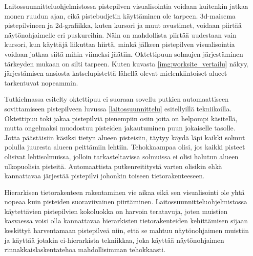 Laitossuunnitteluohjelmistossa pistepilven visualisointia voidaan kuitenkin jatkaa monen ruudun ajan, eikä pistebudjetin käyttäminen ole tarpeen. 3d-maisema pistepilvineen ja 2d-grafiikka, kuten kursori ja muut avustimet, voidaan piirtää näytönohjaimelle eri puskureihin. Näin on mahdollista piirtää uudestaan vain kursori, kun käyttäjä liikuttaa hiirtä, minkä jälkeen pistepilven visualisointia voidaan jatkaa siitä mihin viimeksi jäätiin. Oktettipuun solmujen järjestäminen tärkeyden mukaan on silti tarpeen. Kuten kuvasta \ref{img:worksite_vertailu} näkyy, järjestämisen ansiosta katselupistettä lähellä olevat mielenkiintoiset alueet tarkentuvat nopeammin.


Tutkielmassa esitelty oktettipuu ei suoraan sovellu putkien automaattiseen sovittamiseen pistepilveen luvussa \ref{laitossuunnittelu} esitellyillä tekniikoilla. Oktettipuu toki jakaa pistepilviä pienempiin osiin joita on helpompi käsitellä, mutta ongelmaksi muodostuu pisteiden jakautuminen puun jokaiselle tasolle. Jotta päästäisiin käsiksi tietyn alueen pisteisiin, täytyy käydä läpi kaikki solmut polulla juuresta alueen peittämiin lehtiin. Tehokkaampaa olisi, jos kaikki pisteet olisivat lehtisolmuissa, jolloin tarkasteltavissa solmuissa ei olisi halutun alueen ulkopuolisia pisteitä. Automaattista putkenreititystä varten olisikin ehkä kannattavaa järjestää pistepilvi johonkin toiseen tietorakenteeseen. 

Hierarkisen tietorakenteen rakentaminen vie aikaa eikä sen visualisointi ole yhtä nopeaa kuin pisteiden suoraviivainen piirtäminen. Laitossuunnitteluohjelmistossa käytettävien pistepilvien kokoluokka on harvoin teratavuja, joten muistien kasvaessa voisi olla kannattavaa hierarkisten tietorakenteiden kehittämisen sijaan keskittyä harventamaan pistepilveä niin, että se mahtuu näytönohjaimen muistiin ja käyttää jotakin ei-hierarkista tekniikkaa, joka käyttää näytönohjaimen rinnakkaislaskentatehoa mahdollisimman tehokkaasti.%

